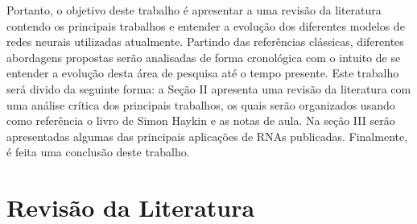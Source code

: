 \documentclass[conference]{IEEEtran}
\begin{document}
	Portanto, o objetivo deste trabalho é apresentar a uma revisão da literatura contendo os principais trabalhos e entender a evolução dos diferentes modelos de redes neurais utilizadas atualmente. Partindo das referências clássicas, diferentes abordagens propostas serão analisadas de forma cronológica com o intuito de se entender a evolução desta área de pesquisa até o tempo presente. Este trabalho será divido da seguinte forma: a Seção II apresenta uma revisão da literatura com uma análise crítica dos principais trabalhos, os quais serão organizados usando como referência o livro de Simon Haykin \cite{haykin2007neural} e as notas de aula. Na seção III serão apresentadas algumas das principais aplicações de RNAs publicadas. Finalmente, é feita uma conclusão deste trabalho.
		
	

%
%
	
	\section{Revisão da Literatura}
	
\end{document}
